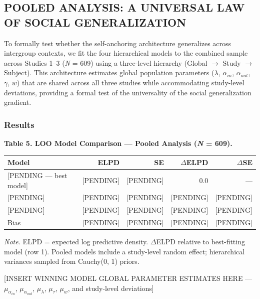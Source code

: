 \documentclass[
  man,
  longtable,
  nolmodern,
  notxfonts,
  notimes,
  man]{apa7}
\begin{document}
\subsection{POOLED ANALYSIS: A UNIVERSAL LAW OF SOCIAL
GENERALIZATION}\label{pooled-analysis-a-universal-law-of-social-generalization}

To formally test whether the self-anchoring architecture generalizes
across intergroup contexts, we fit the four hierarchical models to the
combined sample across Studies 1--3 (\emph{N} = 609) using a three-level
hierarchy (Global \(\rightarrow\) Study \(\rightarrow\) Subject). This
architecture estimates global population parameters (\(\lambda\),
\(\alpha_{in}\), \(\alpha_{out}\), \(\gamma\), \(w\)) that are shared
across all three studies while accommodating study-level deviations,
providing a formal test of the universality of the social generalization
gradient.

\subsubsection{Results}\label{results-3}

\textbf{Table 5. LOO Model Comparison --- Pooled Analysis (\emph{N} =
609).}

\begin{longtable}[]{@{}lrrrr@{}}
\toprule\noalign{}
Model & ELPD & SE & \(\Delta\)ELPD & \(\Delta\)SE \\
\midrule\noalign{}
\endhead
\bottomrule\noalign{}
\endlastfoot
{[}PENDING --- best model{]} & {[}PENDING{]} & {[}PENDING{]} & 0.0 &
--- \\
{[}PENDING{]} & {[}PENDING{]} & {[}PENDING{]} & {[}PENDING{]} &
{[}PENDING{]} \\
{[}PENDING{]} & {[}PENDING{]} & {[}PENDING{]} & {[}PENDING{]} &
{[}PENDING{]} \\
Bias & {[}PENDING{]} & {[}PENDING{]} & {[}PENDING{]} & {[}PENDING{]} \\
\end{longtable}

\emph{Note.} ELPD = expected log predictive density. \(\Delta\)ELPD
relative to best-fitting model (row 1). Pooled models include a
study-level random effect; hierarchical variances sampled from Cauchy(0,
1) priors.

{[}INSERT WINNING MODEL GLOBAL PARAMETER ESTIMATES HERE ---
\(\mu_{\alpha_{in}}\), \(\mu_{\alpha_{out}}\), \(\mu_\lambda\),
\(\mu_\tau\), \(\mu_w\), and study-level deviations{]}
\end{document}
